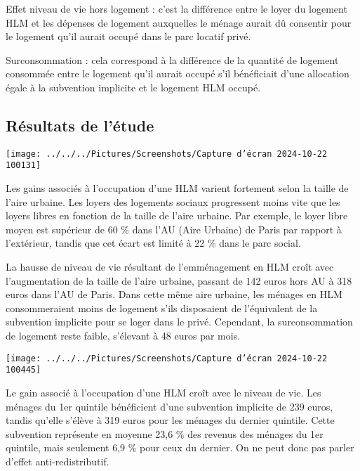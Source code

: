 \documentclass[a4paper, 12pt]{report}
\begin{document}
Effet niveau de vie hors logement : c'est la différence entre le loyer du logement HLM et les dépenses de logement auxquelles le ménage aurait dû consentir pour le logement qu’il aurait occupé dans le parc locatif privé.

Surconsommation : cela correspond à la différence de la quantité de logement consommée entre le logement qu’il aurait occupé s’il bénéficiait d’une allocation égale à la subvention implicite et le logement HLM occupé.

\subsection{Résultats de l'étude}

\begin{center}
	\texttt{[image: ../../../Pictures/Screenshots/Capture d'écran 2024-10-22 100131]}
\end{center}

Les gains associés à l’occupation d’une HLM varient fortement selon la taille de l’aire urbaine. Les loyers des logements sociaux progressent moins vite que les loyers libres en fonction de la taille de l’aire urbaine. Par exemple, le loyer libre moyen est supérieur de 60 \% dans l’AU (Aire Urbaine) de Paris par rapport à l’extérieur, tandis que cet écart est limité à 22 \% dans le parc social.

La hausse de niveau de vie résultant de l’emménagement en HLM croît avec l’augmentation de la taille de l’aire urbaine, passant de 142 euros hors AU à 318 euros dans l’AU de Paris. Dans cette même aire urbaine, les ménages en HLM consommeraient moins de logement s’ils disposaient de l’équivalent de la subvention implicite pour se loger dans le privé. Cependant, la surconsommation de logement reste faible, s’élevant à 48 euros par mois.

\begin{center}
	\texttt{[image: ../../../Pictures/Screenshots/Capture d'écran 2024-10-22 100445]}
\end{center}

Le gain associé à l’occupation d’une HLM croît avec le niveau de vie. Les ménages du 1er quintile bénéficient d’une subvention implicite de 239 euros, tandis qu’elle s’élève à 319 euros pour les ménages du dernier quintile. Cette subvention représente en moyenne 23,6 \% des revenus des ménages du 1er quintile, mais seulement 6,9 \% pour ceux du dernier. On ne peut donc pas parler d’effet anti-redistributif.
\end{document}
